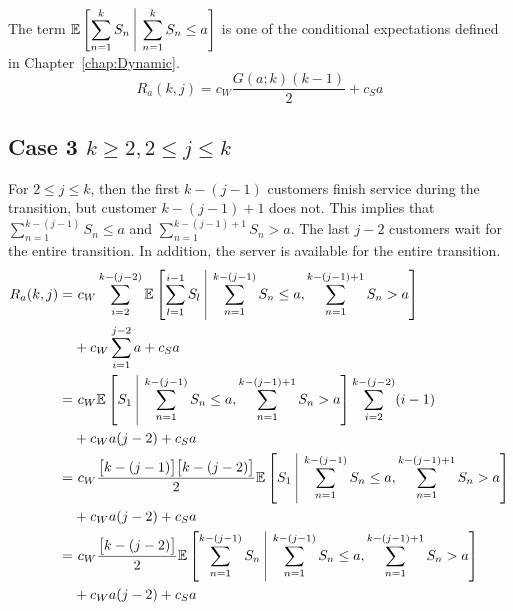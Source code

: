 The term $\displaystyle \mathbb{E} \left[ \sum_{n = 1}^{k} S_{n} \ \vline \ \sum_{n = 1}^{k} S_{n} \leq a \right]$ is one of the conditional expectations defined in Chapter~\ref{chap:Dynamic}.
\begin{equation}
	R_{a} (k, j) = c_{W} \frac{G (a; k) (k - 1)}{2} + c_{S} a
\end{equation}

\subsection{Case 3 $k \geq 2, 2 \leq j \leq k$}
For $2 \leq j \leq k$, then the first $k - (j - 1)$ customers finish service during the transition, but customer $k - (j - 1) + 1$ does not. This implies that $\displaystyle \sum_{n = 1}^{k - (j - 1)} S_{n} \leq a$ and $\displaystyle \sum_{n = 1}^{k - (j - 1) + 1} S_{n} > a$. The last $j - 2$ customers wait for the entire transition. In addition, the server is available for the entire transition.
\begin{equation}
	\begin{split}
		R_{a} (k, j)
		= & \ c_{W} \sum_{i = 2}^{k - (j - 2)} \mathbb{E} \left[ \sum_{l = 1}^{i - 1} S_{l} \ \vline \ \sum_{n = 1}^{k - (j - 1)} S_{n} \leq a, \sum_{n = 1}^{k - (j - 1) + 1} S_{n} > a \right] \\
		& + c_{W} \sum_{i = 1}^{j - 2} a + c_{S} a \\
		= & \ c_{W} \mathbb{E} \left[ S_{1} \ \vline \ \sum_{n = 1}^{k - (j - 1)} S_{n} \leq a, \sum_{n = 1}^{k - (j - 1) + 1} S_{n} > a \right] \sum_{i = 2}^{k - (j - 2)} (i - 1) \\
		& + c_{W} a (j - 2) + c_{S} a \\
		= & \ c_{W} \frac{ \big[ k - (j - 1) \big] \big[ k - (j - 2) \big]}{2} \mathbb{E} \left[ S_{1} \ \vline \ \sum_{n = 1}^{k - (j - 1)} S_{n} \leq a, \sum_{n = 1}^{k - (j - 1) + 1} S_{n} > a \right] \\
		& + c_{W} a (j - 2) + c_{S} a \\
		= & \ c_{W} \frac{ \big[ k - (j - 2) \big]}{2} \mathbb{E} \left[ \sum_{n = 1}^{k - (j - 1)} S_{n} \ \vline \ \sum_{n = 1}^{k - (j - 1)} S_{n} \leq a, \sum_{n = 1}^{k - (j - 1) + 1} S_{n} > a \right] \\
		& + c_{W} a (j - 2) + c_{S} a \\
	\end{split}
\end{equation}

